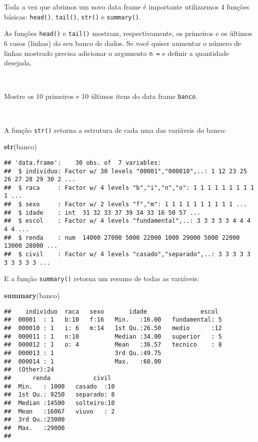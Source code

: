 \documentclass[]{book}
\newenvironment{Shaded}{\begin{snugshade}}{\end{snugshade}}
\newcommand{\KeywordTok}[1]{\textcolor[rgb]{0.13,0.29,0.53}{\textbf{#1}}}
\newcommand{\NormalTok}[1]{#1}
\theoremstyle{definition}
\theoremstyle{definition}
\theoremstyle{definition}
\theoremstyle{remark}
\let\BeginKnitrBlock\begin \let\EndKnitrBlock\end
\begin{document}
Toda a vez que abrimos um novo data frame é importante utilizarmos 4 funções básicas: \texttt{head()}, \texttt{tail()}, \texttt{str()} e \texttt{summary()}.

As funções \texttt{head()} e \texttt{tail()} mostram, respectivamente, os primeiros e os últimos 6 casos (linhas) do seu banco de dados. Se você quiser aumentar o número de linhas mostrado precisa adicionar o argumento \texttt{n\ =} e definir a quantidade desejada.

~
\BeginKnitrBlock{exercise}
\protect\hypertarget{exr:unnamed-chunk-70}{}{\label{exr:unnamed-chunk-70} }Mostre os 10 primeiros e 10 últimos itens do data frame \texttt{banco}.
\EndKnitrBlock{exercise}

~

A função \texttt{str()} retorna a estrutura de cada uma das variáveis do banco:

\begin{Shaded}
\begin{Highlighting}[]
\KeywordTok{str}\NormalTok{(banco)}
\end{Highlighting}
\end{Shaded}

\begin{verbatim}
## 'data.frame':    30 obs. of  7 variables:
##  $ individuo: Factor w/ 30 levels "00001","000010",..: 1 12 23 25 26 27 28 29 30 2 ...
##  $ raca     : Factor w/ 4 levels "b","i","n","o": 1 1 1 1 1 1 1 1 1 1 ...
##  $ sexo     : Factor w/ 2 levels "f","m": 1 1 1 1 1 1 1 1 1 1 ...
##  $ idade    : int  31 32 33 37 39 34 33 16 50 57 ...
##  $ escol    : Factor w/ 4 levels "fundamental",..: 3 3 3 3 3 4 4 4 4 4 ...
##  $ renda    : num  14000 27000 5000 22000 1000 29000 5000 22000 13000 28000 ...
##  $ civil    : Factor w/ 4 levels "casado","separado",..: 3 3 3 3 3 3 3 3 3 3 ...
\end{verbatim}

E a função \texttt{summary()} retorna um resumo de todas as variáveis:

\begin{Shaded}
\begin{Highlighting}[]
\KeywordTok{summary}\NormalTok{(banco)}
\end{Highlighting}
\end{Shaded}

\begin{verbatim}
##    individuo  raca   sexo       idade               escol   
##  00001  : 1   b:10   f:16   Min.   :16.00   fundamental: 5  
##  000010 : 1   i: 6   m:14   1st Qu.:26.50   medio      :12  
##  000011 : 1   n:10          Median :34.00   superior   : 5  
##  000012 : 1   o: 4          Mean   :36.57   tecnico    : 8  
##  000013 : 1                 3rd Qu.:49.75                   
##  000014 : 1                 Max.   :60.00                   
##  (Other):24                                                 
##      renda            civil   
##  Min.   : 1000   casado  :10  
##  1st Qu.: 9250   separado: 8  
##  Median :14500   solteiro:10  
##  Mean   :16067   viuvo   : 2  
##  3rd Qu.:23000                
##  Max.   :29000                
## 
\end{verbatim}
\end{document}
